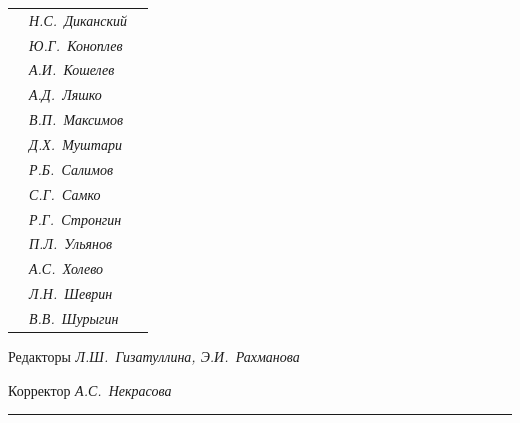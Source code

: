 \begin{tabular}{p{63mm}p{40mm}p{50mm}}
                               &   \it Н.С.~Диканский & \\


                               &   \it Ю.Г.~Коноплев & \\


                               &   \it А.И.~Кошелев  & \\


                               &   \it А.Д.~Ляшко  & \\


                               &   \it В.П.~Максимов  & \\


                               &   \it Д.Х.~Муштари & \\


                               &   \it Р.Б.~Салимов  & \\


                               &   \it С.Г.~Самко  & \\


                               &   \it Р.Г.~Стронгин  & \\


                               &   \it П.Л.~Ульянов  & \\


                               &   \it А.С.~Холево  & \\


                               &   \it Л.Н.~Шеврин  & \\


                               &   \it В.В.~Шурыгин  & \\


\end{tabular} 


\bigskip 


\bigskip 


\bigskip 





 


\centerline{Редакторы \it Л.Ш.~Гизатуллина, Э.И.~Рахманова}


\centerline{Корректор \it А.С.~Некрасова}


\bigskip 


\hrule 


\setlength{\hoffset}{-23mm}


\bigskip


